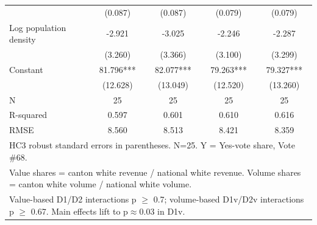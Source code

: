 \begin{table}[htbp]
\begin{tabular}{l*{4}{c}}
            &     (0.087)   &     (0.087)   &     (0.079)   &     (0.079)   \\
Log population density&      -2.921   &      -3.025   &      -2.246   &      -2.287   \\
            &     (3.260)   &     (3.366)   &     (3.100)   &     (3.299)   \\
Constant    &      81.796***&      82.077***&      79.263***&      79.327***\\
            &    (12.628)   &    (13.049)   &    (12.520)   &    (13.260)   \\
\midrule
N           &          25   &          25   &          25   &          25   \\
R-squared   &       0.597   &       0.601   &       0.610   &       0.616   \\
RMSE        &       8.560   &       8.513   &       8.421   &       8.359   \\
\bottomrule
\multicolumn{5}{l}{\footnotesize HC3 robust standard errors in parentheses.  N=25.  Y = Yes-vote share, Vote \#68.}\\
\multicolumn{5}{l}{\footnotesize Value shares = canton white revenue / national white revenue.  Volume shares = canton white volume / national white volume.}\\
\multicolumn{5}{l}{\footnotesize Value-based D1/D2 interactions p $\geq$ 0.7; volume-based D1v/D2v interactions p $\geq$ 0.67.  Main effects lift to p$\approx$0.03 in D1v.}\\
\end{tabular}
\end{table}
